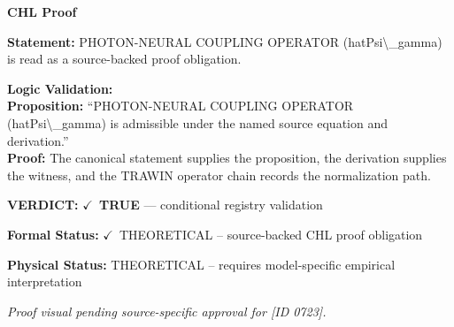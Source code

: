 \vspace{0.45em}
\noindent\textbf{CHL Proof}\par
\textbf{Statement:} PHOTON-NEURAL COUPLING OPERATOR (hatPsi\textbackslash{}\_gamma) is read as a source-backed proof obligation.

\textbf{Logic Validation:}\\
\textbf{Proposition:} ``PHOTON-NEURAL COUPLING OPERATOR (hatPsi\textbackslash{}\_gamma) is admissible under the named source equation and derivation.''\\
\textbf{Proof:} The canonical statement supplies the proposition, the derivation supplies the witness, and the TRAWIN operator chain records the normalization path.

\textbf{VERDICT:} \ensuremath{\checkmark}\ \textbf{TRUE} --- conditional registry validation

\textbf{Formal Status:} \ensuremath{\checkmark}\ THEORETICAL -- source-backed CHL proof obligation

\textbf{Physical Status:} THEORETICAL -- requires model-specific empirical interpretation
\par\vspace{0.45em}
\par
\vfill
\begingroup\footnotesize\itshape
Proof visual pending source-specific approval for [ID 0723].
\par\endgroup
\vfill
\endgroup
\endgroup
